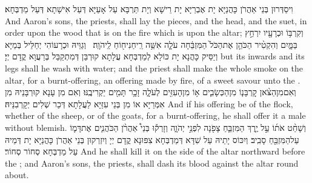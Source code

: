 {וִיסַדְּרוּן בְּנֵי אַהֲרֹן כָּהֲנַיָּא יָת אֶבְרַיָּא יָת רֵישָׁא וְיָת תַּרְבָּא עַל אָעַיָּא דְּעַל אִישָׁתָא דְּעַל מַדְבְּחָא׃}
{And Aaron’s sons, the priests, shall lay the pieces, and the head, and the suet, in order upon the wood that is on the fire which is upon the altar;}{}
{וְקִרְבּ֥וֹ וּכְרָעָ֖יו יִרְחַ֣ץ בַּמָּ֑יִם וְהִקְטִ֨יר הַכֹּהֵ֤ן אֶת\maqqaf הַכֹּל֙ הַמִּזְבֵּ֔חָה עֹלָ֛ה אִשֵּׁ֥ה רֵֽיחַ\maqqaf נִיח֖וֹחַ לַֽיהֹוָֽה׃ \setuma }
{וְגַוֵּיהּ וּכְרָעוֹהִי יְחַלֵּיל בְּמַיָּא וְיַסֵּיק כָּהֲנָא יָת כּוֹלָא לְמַדְבְּחָא עֲלָתָא קוּרְבַּן דְּמִתְקַבַּל בְּרַעֲוָא קֳדָם יְיָ׃}
{but its inwards and its legs shall he wash with water; and the priest shall make the whole smoke on the altar, for a burnt-offering, an offering made by fire, of a sweet savour unto the \lord.}{}
{וְאִם\maqqaf מִן\maqqaf הַצֹּ֨אן קׇרְבָּנ֧וֹ מִן\maqqaf הַכְּשָׂבִ֛ים א֥וֹ מִן\maqqaf הָעִזִּ֖ים לְעֹלָ֑ה זָכָ֥ר תָּמִ֖ים יַקְרִיבֶֽנּוּ׃}
{וְאִם מִן עָנָא קוּרְבָּנֵיהּ מִן אִמְּרַיָּא אוֹ מִן בְּנֵי עִזַּיָּא לַעֲלָתָא דְּכַר שְׁלִים יְקָרְבִנֵּיהּ׃}
{And if his offering be of the flock, whether of the sheep, or of the goats, for a burnt-offering, he shall offer it a male without blemish.}{}
{וְשָׁחַ֨ט אֹת֜וֹ עַ֣ל יֶ֧רֶךְ הַמִּזְבֵּ֛חַ צָפֹ֖נָה לִפְנֵ֣י יְהֹוָ֑ה וְזָרְק֡וּ בְּנֵי֩ אַהֲרֹ֨ן הַכֹּהֲנִ֧ים אֶת\maqqaf דָּמ֛וֹ עַל\maqqaf הַמִּזְבֵּ֖חַ סָבִֽיב׃}
{וְיִכּוֹס יָתֵיהּ עַל שִׁדָּא דְּמַדְבְּחָא צִפּוּנָא קֳדָם יְיָ וְיִזְרְקוּן בְּנֵי אַהֲרֹן כָּהֲנַיָּא יָת דְּמֵיהּ עַל מַדְבְּחָא סְחוֹר סְחוֹר׃}
{And he shall kill it on the side of the altar northward before the \lord; and Aaron’s sons, the priests, shall dash its blood against the altar round about.}{}
